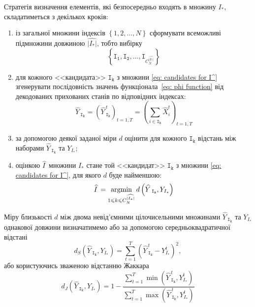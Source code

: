Стратегія визначення елементів, які безпосередньо входять в множину $I_*$, складатиметься з декількох кроків:
\begin{enumerate}
    \item із загальної множини індексів $\left\{ 1,2,\ldots,N \right\}$ сформувати всеможливі підмножини довжиною $\widehat{|I_*|}$, тобто вибірку 
    \begin{equation}\label{eq: candidates for I^}
        \left\{ \mathtt{I_1},\mathtt{I_2},\ldots,\mathtt{I}_{C^{\widehat{|I_*|}}_N} \right\}
    \end{equation}
    \item для кожного <<кандидата>> $\mathtt{I_k}$ з множини \eqref{eq: candidates for I^} згенерувати послідовність значень функціонала~\eqref{eq: phi function} від декодованих прихованих станів по відповідних індексах:
    \begin{equation*}
        \widehat{Y\,}_{\mathtt{I_k}} = \left( \widehat{Y\,}^t_{\mathtt{I_k}} \right)_{t=\overline{1,T}} = \left( \sum_{i \in \mathtt{I_k}} \widehat{X}^t_i \right)_{t=\overline{1,T}}
    \end{equation*}
    \item за допомогою деякої заданої міри $d$ оцінити для кожного $\mathtt{I_k}$ відстань між наборами $\widehat{Y\,}_{\mathtt{I_k}}$ та $Y_{I_*}$;
    \item оцінкою $\widehat{I\,}$ множини $I_*$ стане той <<кандидат>> $\mathtt{I_k}$ з множини \eqref{eq: candidates for I^}, для якого $d$ буде найменшою:
    \begin{equation}\label{eq: I^ estimation}
        \widehat{I\,} = \operatorname*{argmin}\limits_{1\leqslant k \leqslant C^{\widehat{|I_*|}}_N}{d\left( \widehat{Y\,}_{\mathtt{I_k}}, Y_{I_*} \right)}
    \end{equation}
\end{enumerate}

Міру близькості $d$ між двома невід'ємними цілочисельними множинами $\widehat{Y\,}_{\mathtt{I_k}}$ та $Y_{I_*}$ однакової довжини визначатимемо або за допомогою середньоквадратичної відстані
\begin{equation}\label{eq: square average distance}
    d_{S}\left( \widehat{Y\,}_{\mathtt{I_k}},Y_{I_*} \right) = \sum_{t=1}^{T}\left( \widehat{Y\,}^t_{\mathtt{I_k}} - Y^t_{I_*} \right)^2,
\end{equation}
або користуючись зваженою відстанню Жаккара~\cite{Chierichetti2010}
\begin{equation}\label{eq: weighted Jaccard distance}
    d_{J}\left( \widehat{Y\,}_{\mathtt{I_k}},Y_{I_*} \right) = 1 - \frac{\sum\limits_{t=1}^{T}\min{\left( \widehat{Y\,}^t_{\mathtt{I_k}},Y^t_{I_*} \right)}}{\sum\limits_{t=1}^{T}\max{\left( \widehat{Y\,}^t_{\mathtt{I_k}},Y^t_{I_*} \right)}}
\end{equation}

